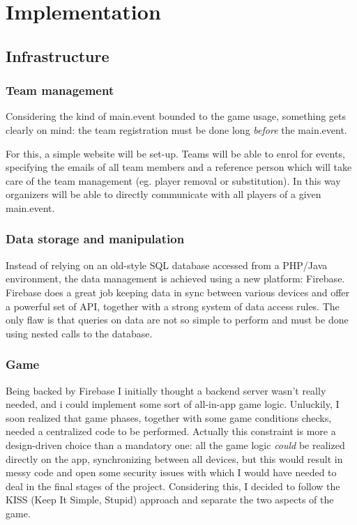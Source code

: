 \chapter{Implementation}

	\section{Infrastructure}
		
		\subsection{Team management}
		
			Considering the kind of main.event bounded to the game usage, something gets clearly on mind: the team registration must be done long \emph{before} the main.event.
			
			For this, a simple website will be set-up. 
			Teams will be able to enrol for events, specifying the emails of all team members and a reference person which will take care of the team management (eg. player removal or substitution).
			In this way organizers will be able to directly communicate with all players of a given main.event.
		
		\subsection{Data storage and manipulation}
			
			Instead of relying on an old-style SQL database accessed from a PHP/Java environment, the data management is achieved using a new platform: Firebase.
			Firebase does a great job keeping data in sync between various devices and offer a powerful set of API, together with a strong system of data access rules.
			The only flaw is that queries on data are not so simple to perform and must be done using nested calls to the database.
		
		\subsection{Game}
		
			Being backed by Firebase I initially thought a backend server wasn't really needed, and i could implement some sort of all-in-app game logic.
			Unluckily, I soon realized that game phases, together with some game conditions checks, needed a centralized code to be performed.
			Actually this constraint is more a design-driven choice than a mandatory one: all the game logic \emph{could} be realized directly on the app, synchronizing between all devices, but this would result in messy code and open some security issues with which I would have needed to deal in the final stages of the project.
			Considering this, I decided to follow the KISS (Keep It Simple, Stupid) approach and separate the two aspects of the game.
			
